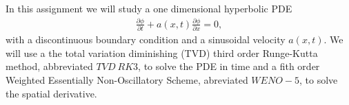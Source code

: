 In this assignment we will study a one dimensional hyperbolic PDE
\begin{align*}
\frac{\partial \phi}{\partial t}+a(x,t)\frac{\partial \phi}{\partial x}=0,
\end{align*}
with a discontinuous boundary condition and a sinusoidal velocity $a(x,t)$. We will use a the total variation diminishing (TVD) third order Runge-Kutta method, abbreviated $TVD~RK3$, to solve the PDE in time and a fith order Weighted Essentially Non-Oscillatory Scheme, abreviated $WENO-5$, to solve the spatial derivative.

